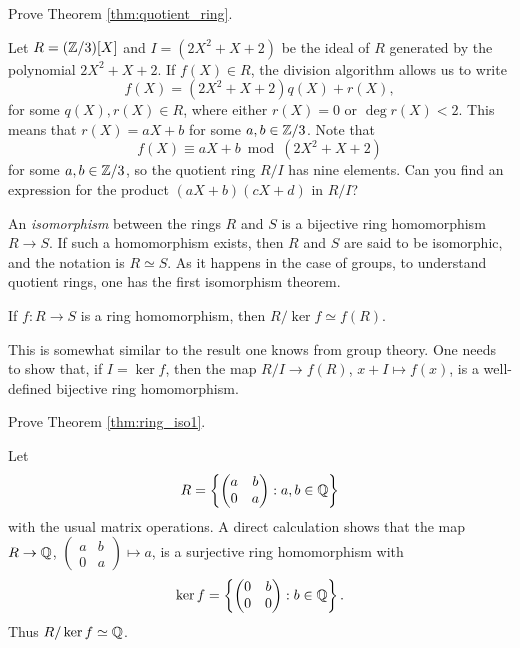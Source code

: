 \begin{exercise}
\label{xca:quotient_ring}
    Prove Theorem \ref{thm:quotient_ring}.
\end{exercise}

\begin{example}
	Let $R=(\mathbb{Z}/3)[X]$ and $I=(2X^2+X+2)$ be the ideal of $R$ 
	generated by the polynomial $2X^2+X+2$. 	If $f(X)\in R$, 
	the division algorithm allows us to write
	\[
	f(X)=(2X^2+X+2)q(X)+r(X),
	\]
	for some $q(X),r(X)\in R$, where either $r(X)=0$ or $\deg r(X)<2$. 
	This means
	that $r(X)=aX+b$ for some $a,b\in\mathbb{Z}/3$.
	Note that
	\[
    f(X)\equiv aX+b\bmod (2X^2+X+2)
    \]
	for some $a,b\in\mathbb{Z}/3$, 
	so the quotient ring $R/I$ has 
	nine elements.  Can you find an expression for the product 
	$(aX+b)(cX+d)$ in $R/I$?
\end{example}

An \emph{isomorphism} between the rings $R$ and $S$ is a bijective
ring homomorphism $R\to S$. If such a homomorphism exists, then $R$ and $S$ are said to be isomorphic, and the notation is 
$R\simeq S$. As it happens in the case of groups, 
to understand quotient rings, one has 
the first isomorphism theorem. 

\begin{theorem}
\label{thm:ring_iso1}
	If $f\colon R\to S$ is a ring homomorphism, then $R/\ker f\simeq f(R)$.  	
\end{theorem}

This is somewhat similar to the result one knows from group theory. 
One needs to show that, if $I=\ker f$, then 
the map $R/I\to f(R)$, $x+I\mapsto f(x)$, is a well-defined 
bijective ring homomorphism. 

\begin{exercise}
\label{xca:first_iso}
    Prove Theorem \ref{thm:ring_iso1}.
\end{exercise}

\begin{example}
Let 
\[
R=\left\{\begin{pmatrix}
a&b\\
0&a
\end{pmatrix}:a,b\in\mathbb{Q}\right\}
\]
with the usual matrix operations. 
A direct calculation shows that the map $R\to\mathbb{Q}$, $\begin{pmatrix}a&b\\0&a\end{pmatrix}\mapsto a$, is a surjective 
ring homomorphism with  
\[
\ker f=\left\{\begin{pmatrix}
0&b\\
0&0\end{pmatrix}:b\in\mathbb{Q}\right\}.
\]
Thus $R/\ker f\simeq\mathbb{Q}$. 	
\end{example}

